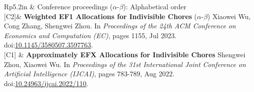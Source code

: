 \documentclass[letterpaper, 11pt]{article}
\newcommand{\headingfont}{\Large\color{OliveGreen}}
\newenvironment{SectionTable}[1]{
	\renewcommand*{\arraystretch}{1.2}
	\setlength{\tabcolsep}{10pt}
	\begin{longtable}{Rp{5.2in}} & #1 \\}
{\end{longtable}\vspace{-1cm}}
\begin{document}
\begin{SectionTable}{\headingfont Conference proceedings \; \small\color{black}  ($\alpha$-$\beta$): Alphabetical order}
\vspace{-0.48cm}\hypertarget{WEF1-EC23}{[C2]}& 
\textbf{Weighted EF1 Allocations for Indivisible Chores} \newline
($\alpha$-$\beta$) Xiaowei Wu, Cong Zhang, Shengwei Zhou.  \newline
In \textit{Proceedings of the 24th ACM Conference on Economics and Computation (EC)}, pages 1155, Jul 2023. doi:\href{https://dl.acm.org/doi/10.1145/3580507.3597763}{10.1145/3580507.3597763}.\\

\vspace{-0.48cm}\hypertarget{EFX-IJCAI22}{[C1]} & 
\textbf{Approximately EFX Allocations for Indivisible Chores} \newline
Shengwei Zhou, Xiaowei Wu.  \newline
In \textit{Proceedings of the 31st International Joint Conference on Artificial Intelligence (IJCAI)}, pages 783-789, Aug 2022. doi:\href{https://www.ijcai.org/proceedings/2022/110}{10.24963/ijcai.2022/110}.\\

\end{SectionTable}
\end{document}
